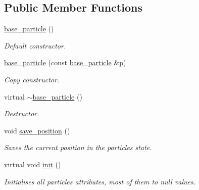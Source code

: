 \subsection*{Public Member Functions}
\begin{DoxyCompactItemize}
\item 
\mbox{\label{classphysim_1_1particles_1_1base__particle_ad42844e13e91c175c3911439a0e08940}} 
\hyperlink{classphysim_1_1particles_1_1base__particle_ad42844e13e91c175c3911439a0e08940}{base\+\_\+particle} ()
\begin{DoxyCompactList}\small\item\em Default constructor. \end{DoxyCompactList}\item 
\mbox{\label{classphysim_1_1particles_1_1base__particle_a3055f0439b30d31a94f0e2b3fc0300d0}} 
\hyperlink{classphysim_1_1particles_1_1base__particle_a3055f0439b30d31a94f0e2b3fc0300d0}{base\+\_\+particle} (const \hyperlink{classphysim_1_1particles_1_1base__particle}{base\+\_\+particle} \&p)
\begin{DoxyCompactList}\small\item\em Copy constructor. \end{DoxyCompactList}\item 
\mbox{\label{classphysim_1_1particles_1_1base__particle_a41ef26ded7282647f2dbe576714f6a4f}} 
virtual \hyperlink{classphysim_1_1particles_1_1base__particle_a41ef26ded7282647f2dbe576714f6a4f}{$\sim$base\+\_\+particle} ()
\begin{DoxyCompactList}\small\item\em Destructor. \end{DoxyCompactList}\item 
void \hyperlink{classphysim_1_1particles_1_1base__particle_aee1ed4e0daca8db01c3a8f150fcdbbb1}{save\+\_\+position} ()
\begin{DoxyCompactList}\small\item\em Saves the current position in the particle\textquotesingle{}s state. \end{DoxyCompactList}\item 
virtual void \hyperlink{classphysim_1_1particles_1_1base__particle_a3bba517d51fd0bff7ec583e701765f87}{init} ()
\begin{DoxyCompactList}\small\item\em Initialises all particle\textquotesingle{}s attributes, most of them to null values. \end{DoxyCompactList}\item 

\end{DoxyCompactItemize}
